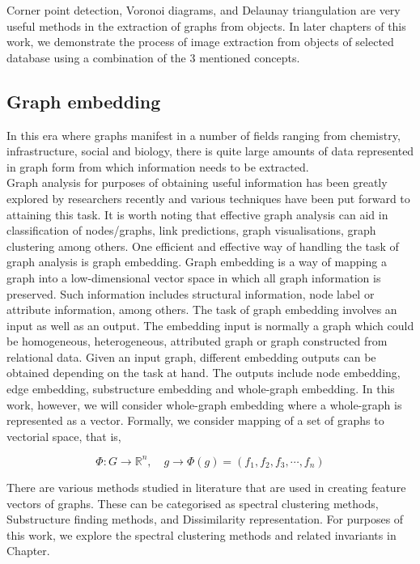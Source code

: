 \documentclass[10pt,a4paper]{article}
\theoremstyle{plain}
\theoremstyle{definition}
\begin{document}
      
      
     Corner point detection, Voronoi diagrams, and Delaunay triangulation are very useful methods in the extraction of graphs from objects. In later chapters of this work, we demonstrate the process of image extraction from objects of selected database using a combination of the $3$ mentioned concepts.
     
     \subsection{Graph embedding}
     In this era where graphs manifest in a number of fields ranging from chemistry, infrastructure, social and biology,  there is quite large amounts of data represented in graph form from which information needs to be extracted. \\
     
     Graph analysis for purposes of obtaining useful information has been greatly explored by researchers recently and various techniques have been put forward to attaining this task. It is worth noting that effective graph analysis can aid in classification of nodes/graphs, link predictions, graph visualisations, graph clustering among others.
     One efficient and effective way of handling the task of graph analysis is graph embedding. Graph embedding is a way of mapping a graph into a low-dimensional vector space in which all graph information is preserved. Such information includes structural information, node label or attribute information, among others. 
     The task of graph embedding involves an input as well as an output. The embedding input is normally a graph which could be homogeneous, heterogeneous, attributed graph or graph constructed from relational data. Given an input graph, different embedding outputs can be obtained depending on the task at hand. The outputs include node embedding, edge embedding, substructure embedding and whole-graph embedding. In this work, however, we will consider whole-graph embedding where a whole-graph is represented as a vector.  Formally, we consider mapping of a set of graphs to vectorial space, that is,
     
     \begin{equation}
     \Phi : G \longrightarrow \mathbb{R}^n, \quad 
     g \longrightarrow \Phi(g) = (f_1, f_2, f_3, \cdots, f_n)
     \end{equation}     
     
     There are various methods studied in literature that are used in creating feature vectors of graphs. These can be categorised as spectral clustering methods, Substructure finding methods, and Dissimilarity representation. For purposes of this work, we explore the spectral clustering methods and related invariants in Chapter. 
     
\end{document}
